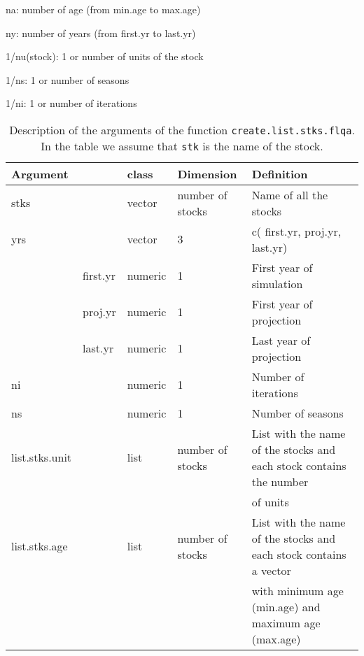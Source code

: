 \begin{landscape}
\begin{table}[!ht]
\begin{footnotesize}
\begin{threeparttable}
      \begin{tablenotes}
        \item na: number of age (from min.age to max.age)
        \item ny: number of years (from first.yr to last.yr)
        \item 1/nu(stock): 1 or number of units of the stock
        \item 1/ns: 1 or number of seasons
        \item 1/ni:  1 or number of iterations
      \end{tablenotes}
      
    \end{threeparttable}
  \end{footnotesize}

\end{table}



\begin{table}[!ht]

  \centering
  \begin{footnotesize}
    
    \caption{Description of the arguments of the function \texttt{create.list.stks.flqa}. 
      In the table we assume that \texttt{stk} is the name of the stock.}
    
    \label{tb:A4.table7}
    
    \begin{tabular}{lllll} %
      \hline 
      Argument & & class & Dimension & Definition\\
      \hline
      stks & & vector & number of stocks &	Name of all the stocks\\
      yrs & & vector & 3 &	c( first.yr, proj.yr, last.yr)\\
        & first.yr & numeric & 1 & First year of simulation\\
        & proj.yr  & numeric & 1 & First year of projection\\
        & last.yr  & numeric & 1 & Last year of projection\\
      ni & & numeric &	1 &	Number of iterations\\
      ns & & numeric &	1 &	Number of seasons\\
      list.stks.unit & & list & number of stocks &	List with the name of the stocks and each stock contains the number\\
       & & & & of units\\
      list.stks.age & & list & number of stocks &	List with the name of the stocks and each stock contains a vector \\
       & & & & with minimum age (min.age) and maximum age (max.age)\\
      \hline
    \end{tabular}
      

\end{footnotesize}
\end{table}
\end{landscape}
